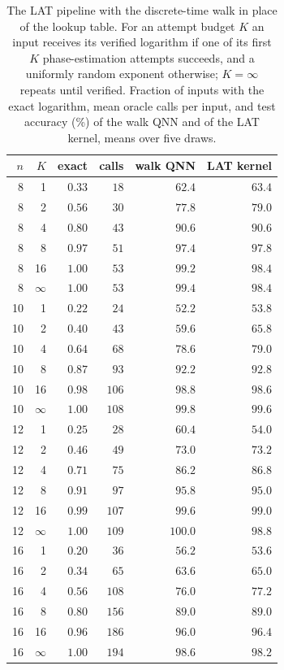 \begin{table}[htbp]
\centering
\small
\setlength{\tabcolsep}{4pt}
\caption[Discrete-logarithm task with the walk DLP step: accuracy against budget]{The LAT pipeline with the discrete-time walk in place of the lookup table. For an attempt budget $K$ an input receives its verified logarithm if one of its first $K$ phase-estimation attempts succeeds, and a uniformly random exponent otherwise; $K = \infty$ repeats until verified. Fraction of inputs with the exact logarithm, mean oracle calls per input, and test accuracy (\%) of the walk QNN and of the LAT kernel, means over five draws.}
\label{tab:dlpbudget}
\begin{tabular}{rrrrrr}
\hline
$n$ & $K$ & exact & calls & walk QNN & LAT kernel \\
\hline
8 & 1 & $0.33$ & $18$ & $62.4$ & $63.4$ \\
8 & 2 & $0.56$ & $30$ & $77.8$ & $79.0$ \\
8 & 4 & $0.80$ & $43$ & $90.6$ & $90.6$ \\
8 & 8 & $0.97$ & $51$ & $97.4$ & $97.8$ \\
8 & 16 & $1.00$ & $53$ & $99.2$ & $98.4$ \\
8 & $\infty$ & $1.00$ & $53$ & $99.4$ & $98.4$ \\
\hline
10 & 1 & $0.22$ & $24$ & $52.2$ & $53.8$ \\
10 & 2 & $0.40$ & $43$ & $59.6$ & $65.8$ \\
10 & 4 & $0.64$ & $68$ & $78.6$ & $79.0$ \\
10 & 8 & $0.87$ & $93$ & $92.2$ & $92.8$ \\
10 & 16 & $0.98$ & $106$ & $98.8$ & $98.6$ \\
10 & $\infty$ & $1.00$ & $108$ & $99.8$ & $99.6$ \\
\hline
12 & 1 & $0.25$ & $28$ & $60.4$ & $54.0$ \\
12 & 2 & $0.46$ & $49$ & $73.0$ & $73.2$ \\
12 & 4 & $0.71$ & $75$ & $86.2$ & $86.8$ \\
12 & 8 & $0.91$ & $97$ & $95.8$ & $95.0$ \\
12 & 16 & $0.99$ & $107$ & $99.6$ & $99.0$ \\
12 & $\infty$ & $1.00$ & $109$ & $100.0$ & $98.8$ \\
\hline
16 & 1 & $0.20$ & $36$ & $56.2$ & $53.6$ \\
16 & 2 & $0.34$ & $65$ & $63.6$ & $65.0$ \\
16 & 4 & $0.56$ & $108$ & $76.0$ & $77.2$ \\
16 & 8 & $0.80$ & $156$ & $89.0$ & $89.0$ \\
16 & 16 & $0.96$ & $186$ & $96.0$ & $96.4$ \\
16 & $\infty$ & $1.00$ & $194$ & $98.6$ & $98.2$ \\
\hline
\end{tabular}
\end{table}
